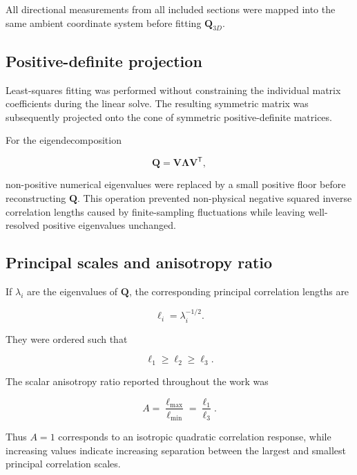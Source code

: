 \documentclass{article}
\begin{document}
All directional measurements from all included sections were mapped into
the same ambient coordinate system before fitting
$\mathbf{Q}_{3D}$.

\subsection{Positive-definite projection}\label{sec:SI_spd}

Least-squares fitting was performed without constraining the individual
matrix coefficients during the linear solve. The resulting symmetric
matrix was subsequently projected onto the cone of symmetric
positive-definite matrices.

For the eigendecomposition

\begin{equation}
    \mathbf{Q}
    =
    \mathbf{V}
    \mathbf{\Lambda}
    \mathbf{V}^{\mathsf T},
\end{equation}

non-positive numerical eigenvalues were replaced by a small positive
floor before reconstructing $\mathbf{Q}$. This operation prevented
non-physical negative squared inverse correlation lengths caused by
finite-sampling fluctuations while leaving well-resolved positive
eigenvalues unchanged.

\subsection{Principal scales and anisotropy ratio}
\label{sec:SI_principal}

If $\lambda_i$ are the eigenvalues of $\mathbf{Q}$, the corresponding
principal correlation lengths are

\begin{equation}
    \ell_i=\lambda_i^{-1/2}.
\end{equation}

They were ordered such that

\begin{equation}
    \ell_1\geq\ell_2\geq\ell_3.
\end{equation}

The scalar anisotropy ratio reported throughout the work was

\begin{equation}
    A=
    \frac{\ell_{\max}}{\ell_{\min}}
    =
    \frac{\ell_1}{\ell_3}.
    \label{eq:SI_A}
\end{equation}

Thus $A=1$ corresponds to an isotropic quadratic correlation response,
while increasing values indicate increasing separation between the
largest and smallest principal correlation scales.
\end{document}
